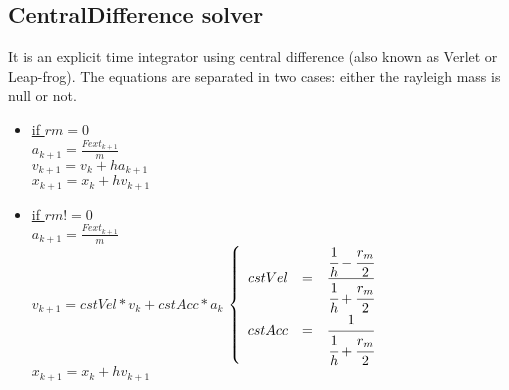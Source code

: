 \documentclass[12pt]{article}
\begin{document}
\begin{doublespace}
\section{CentralDifference solver}
It is an explicit time integrator using central difference (also known as Verlet or Leap-frog). The equations are separated in two cases: either the rayleigh mass is null or not. 
\begin{itemize}
\item \underline {if $rm=0$}
\\$a_{k+1} = \frac{Fext_{k+1}}{m}$
\\$v_{k+1} = v_{k}+ha_{k+1}$
\\$x_{k+1} = x_{k}+hv_{k+1}$
\item \underline{if $rm!=0$}
\\$a_{k+1} = \frac{Fext_{k+1}}{m}$
\\$v_{k+1} = cstVel * v_{k} + cstAcc*a_{k}$      
$\left\{
\begin{array}{r c l}
cstVel &=&  \cfrac{\cfrac{1}{h}-\cfrac{r_{m}}{2}}{\cfrac{1}{h}+\cfrac{r_{m}}{2}}\\
cstAcc &=& \cfrac{1}{\cfrac{1}{h}+\cfrac{r_{m}}{2}}
\end{array}
\right.$
\\$x_{k+1} = x_{k}+hv_{k+1}$
\end{itemize}
\end{doublespace}
\end{document}

